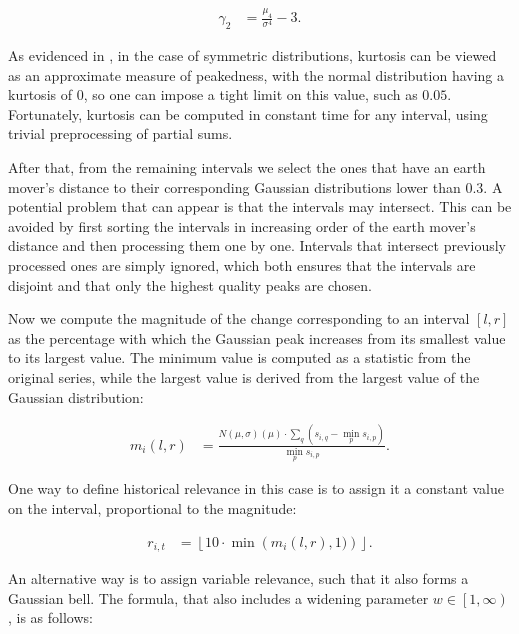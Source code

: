 \begin{align}
\label{eq:kurtosis}
\gamma_2 &= \frac{\mu_4}{\sigma^4} - 3.
\end{align}

As evidenced in , in the case of symmetric distributions, kurtosis can be viewed as an approximate measure of peakedness, with the normal distribution having a kurtosis of $0$, so one can impose a tight limit on this value, such as $0.05$. Fortunately, kurtosis can be computed in constant time for any interval, using trivial preprocessing of partial sums.

After that, from the remaining intervals we select the ones that have an earth mover's distance to their corresponding Gaussian distributions lower than $0.3$. A potential problem that can appear is that the intervals may intersect. This can be avoided by first sorting the intervals in increasing order of the earth mover's distance and then processing them one by one. Intervals that intersect previously processed ones are simply ignored, which both ensures that the intervals are disjoint and that only the highest quality peaks are chosen.

Now we compute the magnitude of the change corresponding to an interval $\left[ l, r \right]$ as the percentage with which the Gaussian peak increases from its smallest value to its largest value. The minimum value is computed as a statistic from the original series, while the largest value is derived from the largest value of the Gaussian distribution:

\begin{align}
\label{eq:gaussian-magnitude}
m_i \left( l, r \right) &= \frac{N \left( \mu, \sigma \right) \left( \mu \right) \cdot \sum_{q} \left( s_{i, q} - \min_{p} s_{i, p} \right)}{\min_{p} s_{i, p}}.
\end{align}

One way to define historical relevance in this case is to assign it a constant value on the interval, proportional to the magnitude:

\begin{align}
\label{eq:gaussian-model-constant-relevance}
r_{i, t} &= \left\lfloor 10 \cdot \min \left( m_i \left( l, r \right), 1) \right) \right\rfloor.
\end{align}

An alternative way is to assign variable relevance, such that it also forms a Gaussian bell. The formula, that also includes a widening parameter $w \in \left[ 1, \infty \right)$, is as follows:

